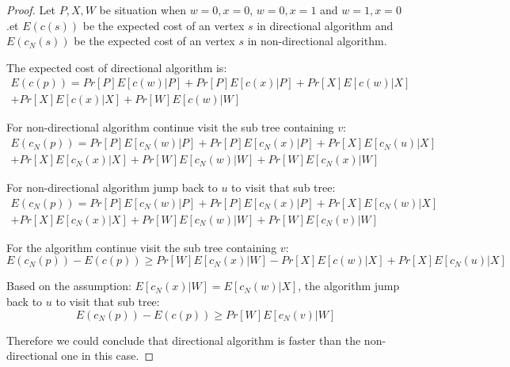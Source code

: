	\begin{proof}
		Let $P,X,W$ be situation when $w=0,x=0$, $w=0,x=1$ and $w=1,x=0$.et $E(c(s))$ be the expected cost of an vertex $s$ in directional algorithm and $E(c_N(s))$ be the expected cost of an vertex $s$ in non-directional algorithm.
		
		The expected cost of directional algorithm is:
		\begin{equation}
		\begin{split}
		    E(c(p))=Pr[P]E[c(w)|P]+Pr[P]E[c(x)|P]+Pr[X]E[c(w)|X] \\
		        +Pr[X]E[c(x)|X]+Pr[W]E[c(w)|W]
		\end{split}
		\end{equation}
		
		For non-directional algorithm continue visit the sub tree containing $v$:
		\begin{equation}
		\begin{split}
		   E(c_N(p))=Pr[P]E[c_N(w)|P]+Pr[P]E[c_N(x)|P]+Pr[X]E[c_N(u)|X] \\
		   +Pr[X]E[c_N(x)|X]+Pr[W]E[c_N(w)|W]+Pr[W]E[c_N(x)|W]
		\end{split}
		\end{equation}
		
		For non-directional algorithm jump back to $u$ to visit that sub tree:
		\begin{equation}
		\begin{split}
		E(c_N(p))=Pr[P]E[c_N(w)|P]+Pr[P]E[c_N(x)|P]+Pr[X]E[c_N(w)|X]\\
		+Pr[X]E[c_N(x)|X]+Pr[W]E[c_N(w)|W]+Pr[W]E[c_N(v)|W]
		\end{split}
		\end{equation}
		
		For the algorithm continue visit the sub tree containing $v$:
		\begin{equation}
		E(c_N(p))-E(c(p))\ge Pr[W]E[c_N(x)|W]-Pr[X]E[c(w)|X]+Pr[X]E[c_N(u)|X]
		\end{equation}
		
		Based on the assumption: $E[c_N(x)|W]=E[c_N(w)|X]$, the algorithm jump back to $u$ to visit that sub tree:
		$$E(c_N(p))-E(c(p))\ge Pr[W]E[c_N(v)|W]$$
		
		Therefore we could conclude that directional algorithm is faster than the non-directional one in this case.
	\end{proof}
	
	
	
	